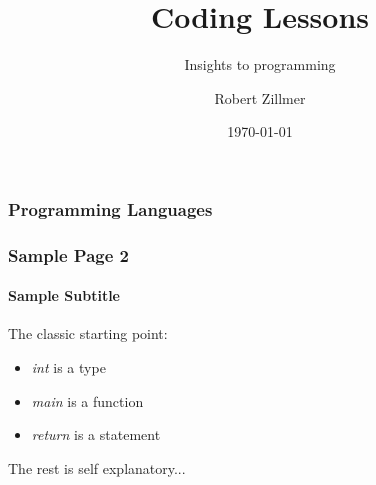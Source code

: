 \title{Coding Lessons}
\subtitle{Insights to programming}
\author{Robert Zillmer}
\date{\today}
\maketitle


\begin{frame}[fragile]
  \frametitle{Programming Languages}
  \begin{center}
  \end{center}
\end{frame}

\begin{frame}[fragile]
  \frametitle{Sample Page 2}
  \framesubtitle{Sample Subtitle}
  The classic starting point:
  \begin{itemize}
    \item \emph{int} is a type
    \item \emph{main} is a function
    \item \emph{return} is a statement
  \end{itemize}
  The rest is self explanatory...
\end{frame}
